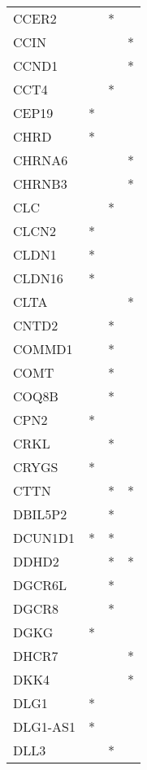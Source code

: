 \begin{longtable}{lccc}
CCER2            &       &  * &         \\
CCIN             &       &    &       * \\
CCND1            &       &    &       * \\
CCT4             &       &  * &         \\
CEP19            &     * &    &         \\
CHRD             &     * &    &         \\
CHRNA6           &       &    &       * \\
CHRNB3           &       &    &       * \\
CLC              &       &  * &         \\
CLCN2            &     * &    &         \\
CLDN1            &     * &    &         \\
CLDN16           &     * &    &         \\
CLTA             &       &    &       * \\
CNTD2            &       &  * &         \\
COMMD1           &       &  * &         \\
COMT             &       &  * &         \\
COQ8B            &       &  * &         \\
CPN2             &     * &    &         \\
CRKL             &       &  * &         \\
CRYGS            &     * &    &         \\
CTTN             &       &  * &       * \\
DBIL5P2          &       &  * &         \\
DCUN1D1          &     * &  * &         \\
DDHD2            &       &  * &       * \\
DGCR6L           &       &  * &         \\
DGCR8            &       &  * &         \\
DGKG             &     * &    &         \\
DHCR7            &       &    &       * \\
DKK4             &       &    &       * \\
DLG1             &     * &    &         \\
DLG1-AS1         &     * &    &         \\
DLL3             &       &  * &         \\

\end{longtable}
